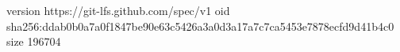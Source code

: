 version https://git-lfs.github.com/spec/v1
oid sha256:ddab0b0a7a0f1847be90e63c5426a3a0d3a17a7c7ca5453e7878ecfd9d41b4c0
size 196704
